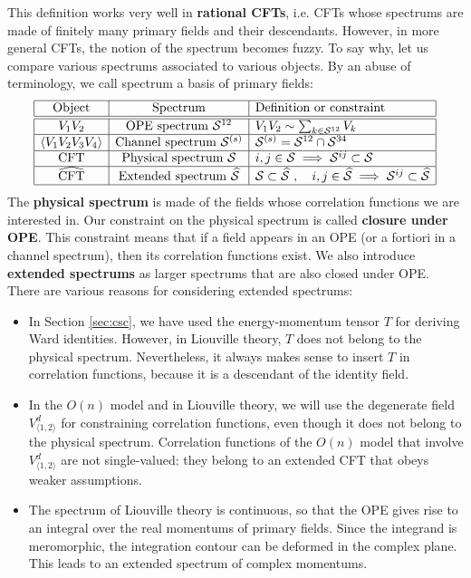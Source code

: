 \documentclass[12pt, a4paper]{article}
\newcommand{\myindex}[1]{\textbf{\boldmath #1}}
\theoremstyle{break}
\begin{document}
This definition works very well in \myindex{rational CFTs}, i.e. CFTs whose spectrums are made of finitely many primary fields and their descendants. However, in more general CFTs, the notion of the spectrum becomes fuzzy. To say why, let us compare various spectrums associated to various objects. By an abuse of terminology, we call spectrum a basis of primary fields: 
\begin{align}
 \begin{array}{|c|c|l|}
  \hline 
  \text{Object} & \text{Spectrum}  & \text{Definition or constraint}
  \\
  \hline \hline 
  V_1V_2 & \text{OPE spectrum } \mathcal{S}^{12} & V_1V_2 \sim \sum_{k\in \mathcal{S}^{12}} V_k 
  \\
  \hline 
  \left<V_1V_2V_3V_4\right> & \text{Channel spectrum } \mathcal{S}^{(s)} &  \mathcal{S}^{(s)}= \mathcal{S}^{12}\cap \mathcal{S}^{34}
  \\
  \hline 
  \text{CFT} & \text{Physical spectrum } \mathcal{S} &  i,j\in\mathcal{S}\implies \mathcal{S}^{ij}\subset \mathcal{S}  
  \\
  \hline 
  \widehat{\text{CFT}} & \text{Extended spectrum } \widehat{\mathcal{S}} & \mathcal{S}\subset \widehat{\mathcal{S}}\ , \quad i,j\in\widehat{\mathcal{S}}\implies \mathcal{S}^{ij}\subset \widehat{\mathcal{S}}
  \\
  \hline 
 \end{array}
 \label{specs}
\end{align}
The \myindex{physical spectrum} is made of the fields whose correlation functions we are interested in. Our constraint on the physical spectrum is called \myindex{closure under OPE}. This constraint means that if a field appears in an OPE (or a fortiori in a channel spectrum), then its correlation functions exist. 
We also introduce \myindex{extended spectrums} as larger spectrums that are also closed under OPE. There are various reasons for considering extended spectrums:
\begin{itemize}
 \item In Section \ref{sec:csc}, we have used the energy-momentum tensor $T$ for deriving Ward identities. However, in Liouville theory, $T$ does not belong to the physical spectrum. Nevertheless, it always makes sense to insert $T$ in correlation functions, because it is a descendant of the identity field. 
 \item In the $O(n)$ model and in Liouville theory, we will use the degenerate field $V^d_{\langle 1,2\rangle}$ for constraining correlation functions, even though it does not belong to the physical spectrum. Correlation functions of the $O(n)$ model that involve $V^d_{\langle 1,2\rangle}$ are not single-valued: they belong to an extended CFT that obeys weaker assumptions. 
 \item The spectrum of Liouville theory is continuous, so that the OPE gives rise to an integral over the real momentums of primary fields. Since the integrand is meromorphic, the integration contour can be deformed in the complex plane. This leads to an extended spectrum of complex momentums. 
\end{itemize}
\end{document}
